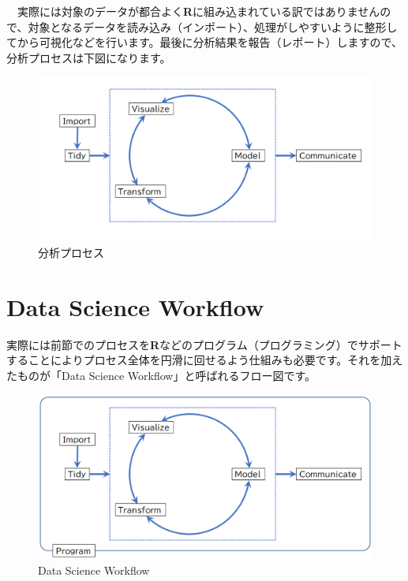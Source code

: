 \documentclass[
  12pt,
]{book}
\begin{document}
　実際には対象のデータが都合よく\textbf{R}に組み込まれている訳ではありませんので、対象となるデータを読み込み（インポート）、処理がしやすいように整形してから可視化などを行います。最後に分析結果を報告（レポート）しますので、分析プロセスは下図になります。

\begin{figure}[H]

{\centering \includegraphics[width=0.9\linewidth,]{./fig/DSWF/data_science_workflow_step2} 

}

\caption{分析プロセス}\label{fig:unnamed-chunk-9}
\end{figure}

\hypertarget{data-science-workflow}{%
\section*{Data Science Workflow}\label{data-science-workflow}}

実際には前節でのプロセスを\textbf{R}などのプログラム（プログラミング）でサポートすることによりプロセス全体を円滑に回せるよう仕組みも必要です。それを加えたものが「Data Science Workflow」と呼ばれるフロー図です。

\begin{figure}[H]

{\centering \includegraphics[width=0.9\linewidth,]{./fig/DSWF/data_science_workflow} 

}

\caption{Data Science Workflow}\label{fig:unnamed-chunk-10}
\end{figure}
\end{document}
